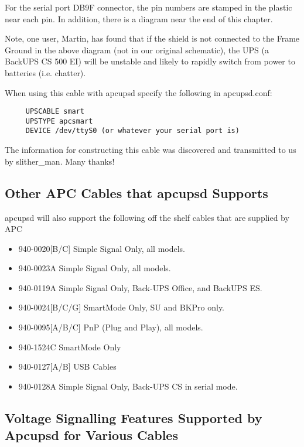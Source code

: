 For the serial port DB9F connector, the pin numbers are stamped in the plastic
near each pin. In addition, there is a diagram near the end of this chapter.  

Note, one user, Martin, has found that if the shield is not connected to the
Frame Ground in the above diagram (not in our original schematic), the UPS (a
BackUPS CS 500 EI) will be unstable and likely to rapidly switch from power to
batteries (i.e. chatter).  

When using this cable with apcupsd specify the following in apcupsd.conf: 

\footnotesize
\begin{verbatim}
     UPSCABLE smart
     UPSTYPE apcsmart
     DEVICE /dev/ttyS0 (or whatever your serial port is)
\end{verbatim}
\normalsize

The information for constructing this cable was discovered and transmitted to
us by slither\_man. Many thanks! 

\subsection*{Other APC Cables that apcupsd Supports}

apcupsd will also support the following off the shelf cables that are supplied
by APC  

\begin{itemize}
\item 940-0020[B/C] Simple Signal Only, all models.  
\item 940-0023A Simple Signal Only, all models.  
\item 940-0119A Simple Signal Only, Back-UPS Office, and BackUPS ES.  
\item 940-0024[B/C/G] SmartMode Only, SU and BKPro only.  
\item 940-0095[A/B/C] PnP (Plug and Play), all models.  
\item 940-1524C SmartMode Only  
\item 940-0127[A/B] USB Cables  
\item 940-0128A Simple Signal Only, Back-UPS CS in serial mode. 
   \end{itemize}

\subsection*{Voltage Signalling Features Supported by Apcupsd for Various
Cables}

